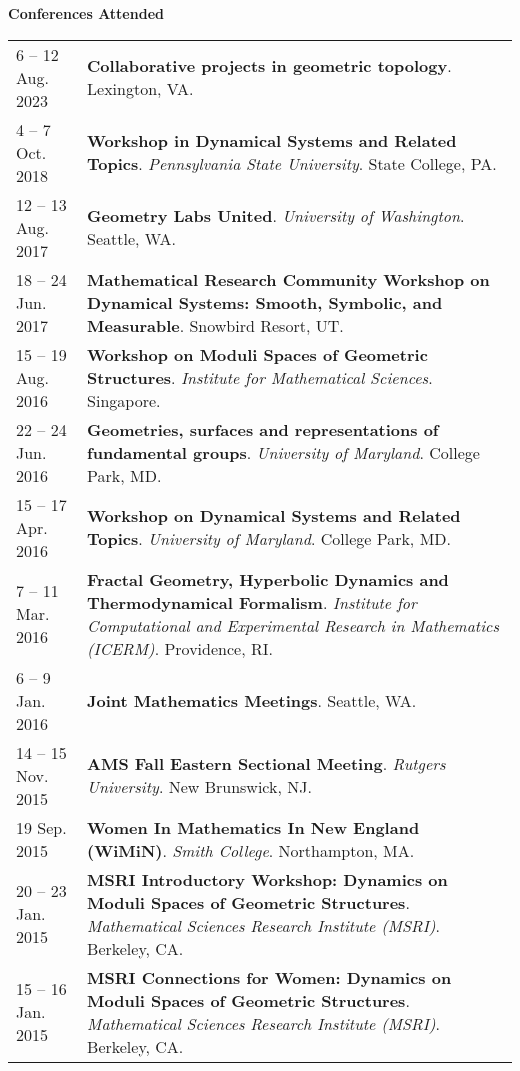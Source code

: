     \vspace{-1em}
    

    \textbf{\large Conferences Attended}
    
    \begin{center}
    {
    \renewcommand{\arraystretch}{1.5}
    \begin{longtable}{p{}  p{}}
    6  -- 12 Aug.  2023 & \textbf{Collaborative projects in geometric topology}.  Lexington, VA.  \\ 
4  -- 7 Oct.  2018 & \textbf{Workshop in Dynamical Systems and Related Topics}. \textit{Pennsylvania State University}.  State College, PA.  \\ 
12  -- 13 Aug.  2017 & \textbf{Geometry Labs United}. \textit{University of Washington}.  Seattle, WA.  \\ 
18  -- 24 Jun.  2017 & \textbf{Mathematical Research Community Workshop on Dynamical Systems:
Smooth, Symbolic, and Measurable}.  Snowbird Resort, UT.  \\ 
15  -- 19 Aug.  2016 & \textbf{Workshop on Moduli Spaces of Geometric Structures}. \textit{Institute for Mathematical Sciences}.  Singapore.  \\ 
22  -- 24 Jun.  2016 & \textbf{Geometries, surfaces and representations of fundamental groups}. \textit{University of Maryland}.  College Park, MD.  \\ 
15  -- 17 Apr.  2016 & \textbf{Workshop on Dynamical Systems and Related Topics}. \textit{University of Maryland}.  College Park, MD.  \\ 
7  -- 11 Mar.  2016 & \textbf{Fractal Geometry, Hyperbolic Dynamics and Thermodynamical Formalism}. \textit{Institute for Computational and Experimental Research in Mathematics (ICERM)}.  Providence, RI.  \\ 
6  -- 9 Jan.  2016 & \textbf{Joint Mathematics Meetings}.  Seattle, WA.  \\ 
14  -- 15 Nov.  2015 & \textbf{AMS Fall Eastern Sectional Meeting}. \textit{Rutgers University}.  New Brunswick, NJ.  \\ 
19 Sep.  2015 & \textbf{Women In Mathematics In New England (WiMiN)}. \textit{Smith College}.  Northampton, MA.  \\ 
20  -- 23 Jan.  2015 & \textbf{MSRI Introductory Workshop: Dynamics on Moduli Spaces of Geometric Structures}. \textit{Mathematical Sciences Research Institute (MSRI)}.  Berkeley, CA.  \\ 
15  -- 16 Jan.  2015 & \textbf{MSRI Connections for Women: Dynamics on Moduli Spaces of Geometric Structures}. \textit{Mathematical Sciences Research Institute (MSRI)}.  Berkeley, CA.  \\ 

\end{longtable}}
\end{center}

